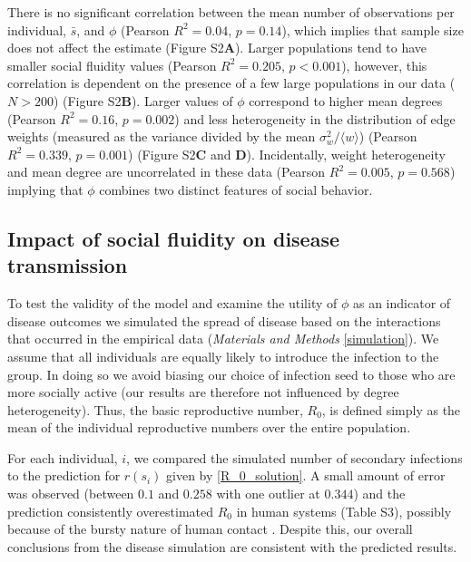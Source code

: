\documentclass[twocolumn,8pt]{article}
\begin{document}
There is no significant correlation between the mean number of observations per individual, $\bar{s}$, and $\phi$ (Pearson $R^{2}=0.04$, $p=0.14$), which implies that sample size does not affect the estimate (Figure S2\textbf{A}). Larger populations tend to have smaller social fluidity values (Pearson $R^{2}=0.205$, $p<0.001$), however, this correlation is dependent on the presence of a few large populations in our data ($N>200$) (Figure S2\textbf{B}). Larger values of $\phi$ correspond to higher mean degrees (Pearson $R^{2}=0.16$, $p=0.002$) and less heterogeneity in the distribution of edge weights (measured as the variance divided by the mean $\sigma_{w}^{2}/\langle w\rangle$)  (Pearson $R^{2}=0.339$, $p=0.001$) (Figure S2\textbf{C} and \textbf{D}). Incidentally, weight heterogeneity and mean degree are uncorrelated in these data (Pearson $R^{2}=0.005$, $p=0.568$) implying that $\phi$ combines two distinct features of social behavior.

\subsection*{Impact of social fluidity on disease transmission}
To test the validity of the model and examine the utility of $\phi$ as an indicator of disease outcomes we simulated the spread of disease based on the interactions that occurred in the empirical data (\emph{Materials and Methods} \ref{simulation}). We assume that all individuals are equally likely to introduce the infection to the group. In doing so we avoid biasing our choice of infection seed to those who are more socially active (our results are therefore not influenced by degree heterogeneity). Thus, the basic reproductive number, $R_{0}$, is defined simply as the mean of the individual reproductive numbers over the entire population.

For each individual, $i$, we compared the simulated number of secondary infections to the prediction for $r(s_{i})$ given by \eqref{R_0_solution}. A small amount of error was observed (between $0.1$ and $0.258$ with one outlier at $0.344$) and the prediction consistently overestimated $R_{0}$ in human systems (Table S3), possibly because of the bursty nature of human contact \cite{karsai2011small}. Despite this, our overall conclusions from the disease simulation are consistent with the predicted results.
\end{document}
